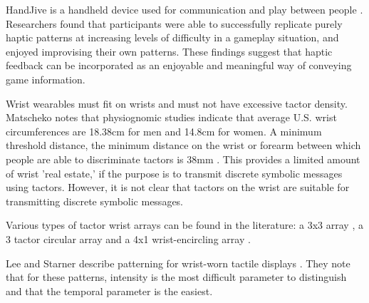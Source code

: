 \documentclass{chi-ext}
\begin{document}

HandJive is a handheld device used for communication and play between people \cite{fogg1998handjive}. Researchers found that participants were able to successfully replicate purely haptic patterns at increasing levels of difficulty in a gameplay situation, and enjoyed improvising their own patterns. These findings suggest that haptic feedback can be incorporated as an enjoyable and meaningful way of conveying game information.

Wrist wearables must fit on wrists and must not have excessive tactor density.  
Matscheko notes that physiognomic studies indicate that average U.S. wrist circumferences are 18.38cm for men and 14.8cm for women. A minimum threshold distance, the minimum distance on the wrist or forearm between which people are able to discriminate tactors is 38mm \cite{matscheko2010tactor}. This provides a limited amount of wrist 'real estate,' if the purpose is to transmit discrete symbolic messages using tactors. However, it is not clear that tactors on the wrist are suitable for transmitting discrete symbolic messages. 

Various types of tactor wrist arrays can be found in the literature:  a 3x3 array \cite{chen2008tactor}, a 3 tactor circular array \cite{lee2010buzzwear} and a 4x1 wrist-encircling array \cite{matscheko2010tactor}.


Lee and Starner describe patterning for wrist-worn tactile displays \cite{lee2010buzzwear}. They note that for these patterns, intensity is the most difficult parameter to distinguish and that the temporal parameter is the easiest. %


\end{document}
